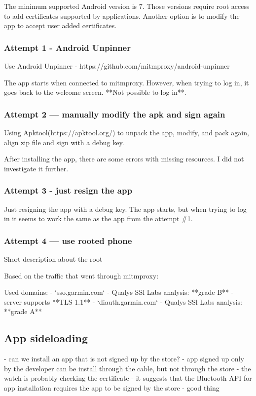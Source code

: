 The minimum supported Android version is 7.
Those versions require root access to add certificates supported by applications.
Another option is to modify the app to accept user added certificates.

\subsubsection{Attempt 1 - Android Unpinner}
Use Android Unpinner - https://github.com/mitmproxy/android-unpinner

The app starts when connected to mitmproxy.
However, when trying to log in, it goes back to the welcome screen.
**Not possible to log in**.
\subsubsection{Attempt 2 — manually modify the apk and sign again}
Using Apktool(https://apktool.org/) to unpack the app, modify, and pack again, align zip file and sign with a debug key.

After installing the app, there are some errors with missing resources.
I did not investigate it further.
\subsubsection{Attempt 3 - just resign the app}
Just resigning the app with a debug key.
The app starts, but when trying to log in it seems to work the same as the app from the attempt \#1.
\subsubsection{Attempt 4 — use rooted phone}
Short description about the root

Based on the traffic that went through mitmproxy:

Used domains:
- `sso.garmin.com` - Qualys SSl Labs analysis: **grade B**
- server supports **TLS 1.1**
- `diauth.garmin.com` - Qualys SSl Labs analysis: **grade A**


\subsection{App sideloading}
- can we install an app that is not signed up by the store?
- app signed up only by the developer can be install through the cable, but not through the store
- the watch is probably checking the certificate
- it suggests that the Bluetooth API for app installation requires the app to be signed by the store - good thing
